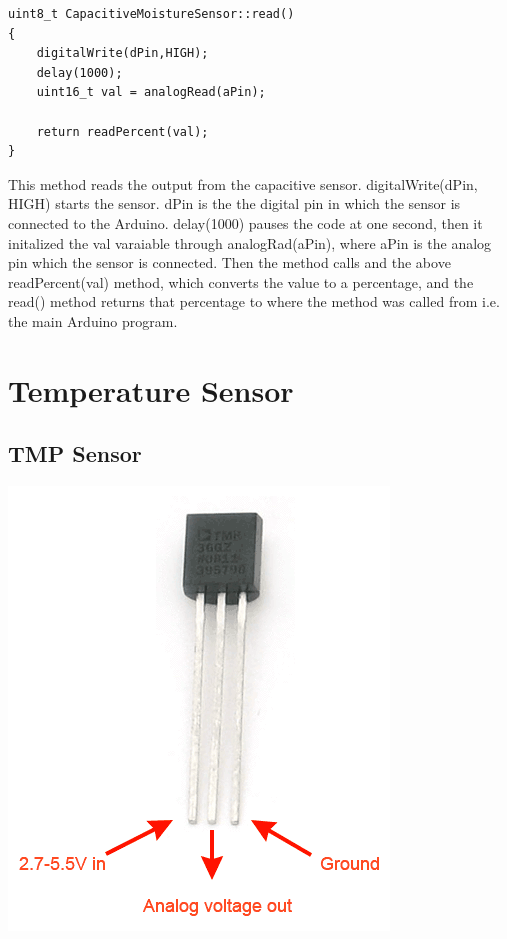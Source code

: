 \documentclass[a4paper,12pt,twoside,openright,titlepage]{book}
\begin{document}
\begin{lstlisting}[language=Arduino]
uint8_t CapacitiveMoistureSensor::read()
{
	digitalWrite(dPin,HIGH);
	delay(1000);
    uint16_t val = analogRead(aPin);
	
    return readPercent(val);
}
\end{lstlisting}

This method reads the output from the capacitive sensor. digitalWrite(dPin, HIGH) starts the sensor. dPin is the the digital pin in which the sensor is connected to the Arduino. delay(1000) pauses the code at one second, then it initalized the val varaiable through analogRad(aPin), where aPin is the analog pin which the sensor is connected. Then the method calls and  the above readPercent(val) method, which converts the value to a percentage, and the read() method returns that percentage to where the method was called from i.e. the main Arduino program.

\section{Temperature Sensor}
\subsection{TMP Sensor}
\includegraphics[scale=1]{TMP-36}
\end{document}
